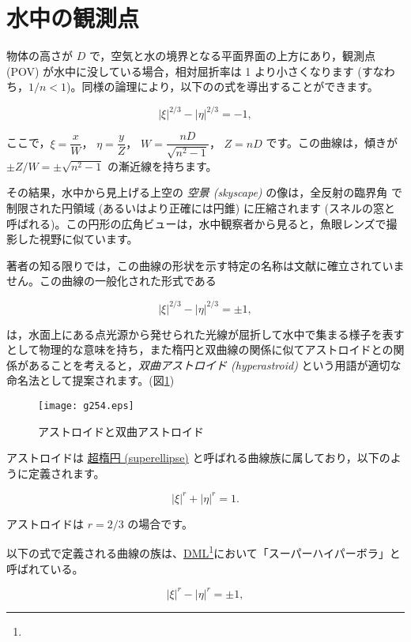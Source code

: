 \documentclass[twocolumn]{article}
\begin{document}
\section{水中の観測点}

物体の高さが $D$ で，空気と水の境界となる平面界面の上方にあり，観測点 (POV) が水中に没している場合，相対屈折率は 1 より小さくなります (すなわち，$1/n < 1$)。同様の論理により，以下のの式を導出することができます。

$$ \left| \xi \right|^{2/3} - \left| \eta \right|^{2/3} = -1, $$

ここで，$\xi = \dfrac{x}{W}，$ $\eta = \dfrac{y}{Z}，$ $W = \dfrac{nD}{\sqrt{n^2-1}}，$ $Z = nD$ です。この曲線は，傾きが $\pm Z/W = \pm \sqrt{n^2-1}$ の漸近線を持ちます。

その結果，水中から見上げる上空の \emph{空景 (skyscape)} の像は，全反射の臨界角  で制限された円領域 (あるいはより正確には円錐) に圧縮されます (スネルの窓と呼ばれる)。この円形の広角ビューは，水中観察者から見ると，魚眼レンズで撮影した視野に似ています。

著者の知る限りでは，この曲線の形状を示す特定の名称は文献に確立されていません。この曲線の一般化された形式である

$$ \left| \xi \right|^{2/3} - \left| \eta \right|^{2/3} = \pm1, $$

は，水面上にある点光源から発せられた光線が屈折して水中で集まる様子を表すとして物理的な意味を持ち，また楕円と双曲線の関係に似てアストロイドとの関係があることを考えると，\emph{双曲アストロイド (hyperastroid)} という用語が適切な命名法として提案されます。(図\ref{fig:hyperastroid})

\begin{figure}
	\centering
	\texttt{[image: g254.eps]}
	\caption{アストロイドと双曲アストロイド}
	\label{fig:hyperastroid}
\end{figure}

アストロイドは \href{https://mathworld.wolfram.com/Astroid.html}{超楕円 (superellipse)} と呼ばれる曲線族に属しており，以下のように定義されます。

$$ \left| \xi \right|^{r} + \left| \eta \right|^{r} = 1. $$

アストロイドは $r = 2/3$ の場合です。

以下の式で定義される曲線の族は、\href{http://dynamicmathematicslearning.com/super-ellipse.html}{DML}\footnote{}において「スーパーハイパーボラ」と呼ばれている。

$$
\left| \xi \right|^{r} - \left| \eta \right|^{r} = \pm 1,
$$
\end{document}
